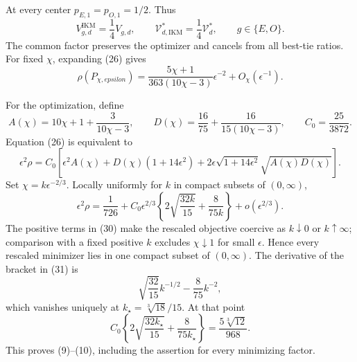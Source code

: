 At every center \(p_{E,1}=p_{O,1}=1/2\).  Thus
\[
 V_{g,d}^{\mathrm{IKM}}=\frac14V_{g,d},
 \qquad
 \mathcal V_{d,\mathrm{IKM}}^*=\frac14\mathcal V_d^*,
 \qquad g\in\{E,O\}.                                     \tag{28}
\]
The common factor preserves the optimizer and cancels from all best-tie ratios.  For fixed \(\chi\), expanding (26) gives
\[
 \rho(P_{\chi,epsilon})
 =\frac{5\chi+1}{363(10\chi-3)}\epsilon^{-2}
 +O_\chi(\epsilon^{-1}).                                  \tag{29}
\]

For the optimization, define
\[
 A(\chi)=10\chi+1+\frac3{10\chi-3},
 \qquad
 D(\chi)=\frac{16}{75}+\frac{16}{15(10\chi-3)},
 \qquad C_0=\frac{25}{3872}.
\]
Equation (26) is equivalent to
\[
 \epsilon^2\rho=C_0\left[
 \epsilon^2A(\chi)+D(\chi)(1+14\epsilon^2)
 +2\epsilon\sqrt{1+14\epsilon^2}\sqrt{A(\chi)D(\chi)}
 \right].                                                  \tag{30}
\]
Set \(\chi=k\epsilon^{-2/3}\).  Locally uniformly for \(k\) in compact subsets of \((0,\infty)\),
\[
 \epsilon^2\rho
 =\frac1{726}+C_0\epsilon^{2/3}
 \left\{2\sqrt{\frac{32k}{15}}+\frac8{75k}\right\}
 +o(\epsilon^{2/3}).                                      \tag{31}
\]
The positive terms in (30) make the rescaled objective coercive as \(k\downarrow0\) or \(k\uparrow\infty\); comparison with a fixed positive \(k\) excludes \(\chi\downarrow1\) for small \(\epsilon\).  Hence every rescaled minimizer lies in one compact subset of \((0,\infty)\).  The derivative of the bracket in (31) is
\[
 \sqrt{\frac{32}{15}}k^{-1/2}-\frac8{75}k^{-2},
\]
which vanishes uniquely at \(k_\star=\sqrt[3]{18}/15\).  At that point
\[
 C_0\left\{2\sqrt{\frac{32k_\star}{15}}+\frac8{75k_\star}\right\}
 =\frac{5\sqrt[3]{12}}{968}.
\]
This proves (9)--(10), including the assertion for every minimizing factor.